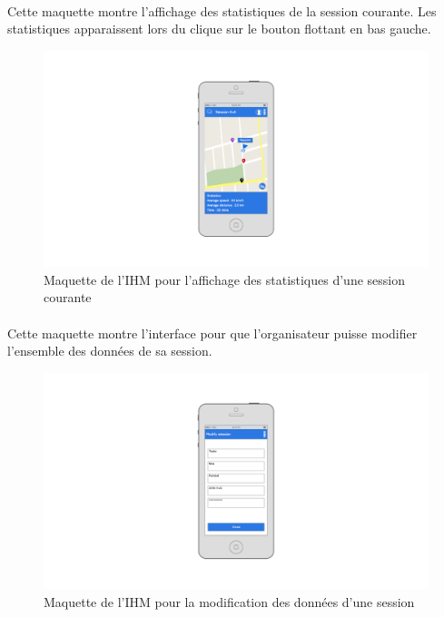 \documentclass[titlepage, 12pt]{report}
\begin{document}
\clearpage

\paragraph{}Cette maquette montre l'affichage des statistiques de la session courante. Les statistiques apparaissent lors du clique sur le bouton flottant en bas gauche.

\begin{figure}[!h]
	\caption{Maquette de l'IHM pour l'affichage des statistiques d'une session courante}
	\label{statistics_view}
	\centering
	\includegraphics[scale=0.3]{images/mockups/statistics.png}
\end{figure}

\clearpage

\paragraph{}Cette maquette montre l'interface pour que l'organisateur puisse modifier l'ensemble des données de sa session.

\begin{figure}[!h]
	\caption{Maquette de l'IHM pour la modification des données d'une session}
	\label{modify_session}
	\centering
	\includegraphics[scale=0.3]{images/mockups/modify_session.png}
\end{figure}
\end{document}
